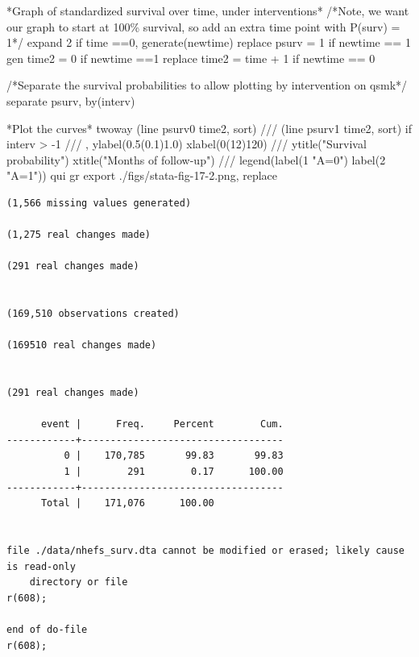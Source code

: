 \documentclass[
  10pt,
  a4paper,
]{book}
\newenvironment{Shaded}{\begin{snugshade}}{\end{snugshade}}
\newcommand{\BaseNTok}[1]{\textcolor[rgb]{0.68,0.00,0.00}{#1}}
\newcommand{\CommentTok}[1]{\textcolor[rgb]{0.37,0.37,0.37}{#1}}
\newcommand{\KeywordTok}[1]{\textcolor[rgb]{0.00,0.46,0.62}{#1}}
\newcommand{\NormalTok}[1]{\textcolor[rgb]{0.00,0.46,0.62}{#1}}
\newcommand{\StringTok}[1]{\textcolor[rgb]{0.13,0.47,0.30}{#1}}
\begin{document}
\begin{Shaded}
\begin{Highlighting}[]
\NormalTok{*Graph }\KeywordTok{of}\NormalTok{ standardized survival }\BaseNTok{over}\NormalTok{ time, under interventions*}
\CommentTok{/*Note, we want our graph to start at 100\% survival, }
\CommentTok{so add an extra time point with P(surv) = 1*/}
\NormalTok{expand 2 }\KeywordTok{if}\NormalTok{ time ==0, }\KeywordTok{generate}\NormalTok{(newtime)}
\KeywordTok{replace}\NormalTok{ psurv  = 1 }\KeywordTok{if}\NormalTok{ newtime == 1}
\KeywordTok{gen}\NormalTok{ time2 = 0 }\KeywordTok{if}\NormalTok{ newtime ==1}
\KeywordTok{replace}\NormalTok{ time2 = time + 1 }\KeywordTok{if}\NormalTok{ newtime == 0}

\CommentTok{/*Separate the survival probabilities to allow plotting by }
\CommentTok{intervention on qsmk*/}
\KeywordTok{separate}\NormalTok{ psurv, }\KeywordTok{by}\NormalTok{(interv)}

\NormalTok{*Plot the curves*}
\KeywordTok{twoway}\NormalTok{ (}\KeywordTok{line}\NormalTok{ psurv0 time2, }\KeywordTok{sort}\NormalTok{) }\CommentTok{///}
\NormalTok{  (}\KeywordTok{line}\NormalTok{ psurv1 time2, }\KeywordTok{sort}\NormalTok{) }\KeywordTok{if}\NormalTok{ interv \textgreater{} {-}1 }\CommentTok{///}
\NormalTok{  , }\KeywordTok{ylabel}\NormalTok{(0.5(0.1)1.0) }\KeywordTok{xlabel}\NormalTok{(0(12)120) }\CommentTok{///}
  \BaseNTok{ytitle}\NormalTok{(}\StringTok{"Survival probability"}\NormalTok{) }\BaseNTok{xtitle}\NormalTok{(}\StringTok{"Months of follow{-}up"}\NormalTok{) }\CommentTok{///}
  \BaseNTok{legend}\NormalTok{(}\KeywordTok{label}\NormalTok{(1 }\StringTok{"A=0"}\NormalTok{) }\KeywordTok{label}\NormalTok{(2 }\StringTok{"A=1"}\NormalTok{))}
\KeywordTok{qui} \KeywordTok{gr} \KeywordTok{export}\NormalTok{ ./figs/stata{-}fig{-}17{-}2.png, }\KeywordTok{replace}
\end{Highlighting}
\end{Shaded}

\begin{verbatim}
(1,566 missing values generated)

(1,275 real changes made)

(291 real changes made)


(169,510 observations created)

(169510 real changes made)


(291 real changes made)

      event |      Freq.     Percent        Cum.
------------+-----------------------------------
          0 |    170,785       99.83       99.83
          1 |        291        0.17      100.00
------------+-----------------------------------
      Total |    171,076      100.00


file ./data/nhefs_surv.dta cannot be modified or erased; likely cause is read-only
    directory or file
r(608);

end of do-file
r(608);
\end{verbatim}
\end{document}
